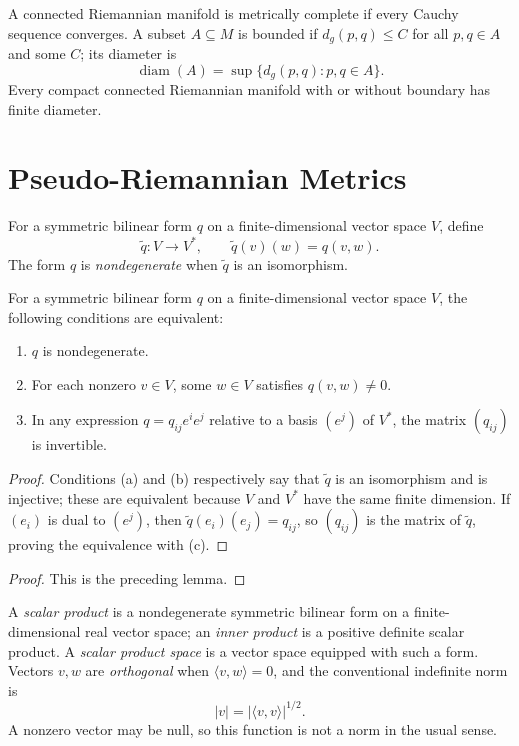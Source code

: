 A connected Riemannian manifold is metrically complete if every Cauchy sequence converges. A subset $A\subseteq M$ is bounded if $d_g(p,q)\le C$ for all $p,q\in A$ and some $C$; its diameter is
\[
\operatorname{diam}(A)=\sup\{d_g(p,q):p,q\in A\}.
\]
Every compact connected Riemannian manifold with or without boundary has finite diameter.
\section{Pseudo-Riemannian Metrics}

For a symmetric bilinear form $q$ on a finite-dimensional vector space $V$, define
\[
\widetilde q\colon V\longrightarrow V^*,
\qquad \widetilde q(v)(w)=q(v,w).
\]
The form $q$ is \emph{nondegenerate} when $\widetilde q$ is an isomorphism.

\begin{lemma}
\label{lem:nondegenerate-symmetric-bilinear}




For a symmetric bilinear form $q$ on a finite-dimensional vector space $V$, the
following conditions are equivalent:
\begin{enumerate}
\item[(a)] $q$ is nondegenerate.
\item[(b)] For each nonzero $v\in V$, some $w\in V$ satisfies $q(v,w)\ne0$.
\item[(c)] In any expression $q=q_{ij}e^ie^j$ relative to a basis $(e^j)$ of
$V^*$, the matrix $(q_{ij})$ is invertible.
\end{enumerate}
\end{lemma}

\begin{proof}

\sketch Conditions (a) and (b) respectively say that $\widetilde q$ is an
isomorphism and is injective; these are equivalent because $V$ and $V^*$ have the
same finite dimension. If $(e_i)$ is dual to $(e^j)$, then
$\widetilde q(e_i)(e_j)=q_{ij}$, so $(q_{ij})$ is the matrix of $\widetilde q$,
proving the equivalence with (c).
\end{proof}

\begin{proof}

\sketch This is the preceding lemma.
\end{proof}

A \emph{scalar product} is a nondegenerate symmetric bilinear form on a
finite-dimensional real vector space; an \emph{inner product} is a positive
definite scalar product. A \emph{scalar product space} is a vector space equipped
with such a form. Vectors $v,w$ are \emph{orthogonal} when
$\langle v,w\rangle=0$, and the conventional indefinite norm is
\[
|v|=|\langle v,v\rangle|^{1/2}.
\]
A nonzero vector may be null, so this function is not a norm in the usual sense.

